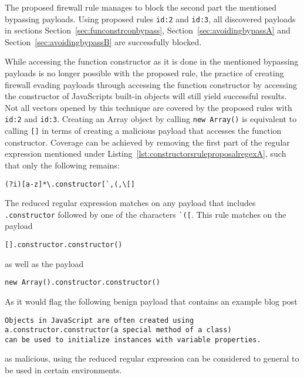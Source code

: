 The proposed firewall rule manages to block the second part the mentioned bypassing payloads. Using proposed rules \verb|id:2| and \verb|id:3|, all discovered payloads in sections Section~\ref{sec:funconstrconbypass}, Section~\ref{sec:avoidingbypassA} and Section~\ref{sec:avoidingbypassB} are successfully blocked.

While accessing the function constructor as it is done in the mentioned bypassing payloads is no longer possible with the proposed rule, the practice of creating firewall evading payloads through accessing the function constructor by accessing the constructor of JavaScripts built-in objects will still yield successful results. Not all vectors opened by this technique are covered by the proposed rules with \verb|id:2| and \verb|id:3|. Creating an Array object by calling \verb|new Array()| is equivalent to calling \verb|[]| in terms of creating a malicious payload that accesses the function constructor.
Coverage can be achieved by removing the first part of the regular expression mentioned under Listing~\ref{lst:constructorsruleproposalregexA}, such that only the following remains:

\begin{lstlisting}[style=basicStyle, caption=reduced regex of proposed rule id:2, label={lst:constructorsruleproposalregexA}]
(?i)[a-z]*\.constructor[`,(,\[]
\end{lstlisting}

The reduced regular expression matches on any payload that includes \verb|.constructor| followed by one of the characters \verb|`([|. This rule matches on the payload

\begin{lstlisting}[style=basicStyle]
[].constructor.constructor()
\end{lstlisting}

as well as the payload

\begin{lstlisting}[style=basicStyle]
new Array().constructor.constructor()
\end{lstlisting}

As it would flag the following benign payload that contains an example blog post
\begin{lstlisting}[style=basicStyle]
Objects in JavaScript are often created using
a.constructor.constructor(a special method of a class)
can be used to initialize instances with variable properties.
\end{lstlisting}
as malicious, using the reduced regular expression can be considered to general to be used in certain environments. 

